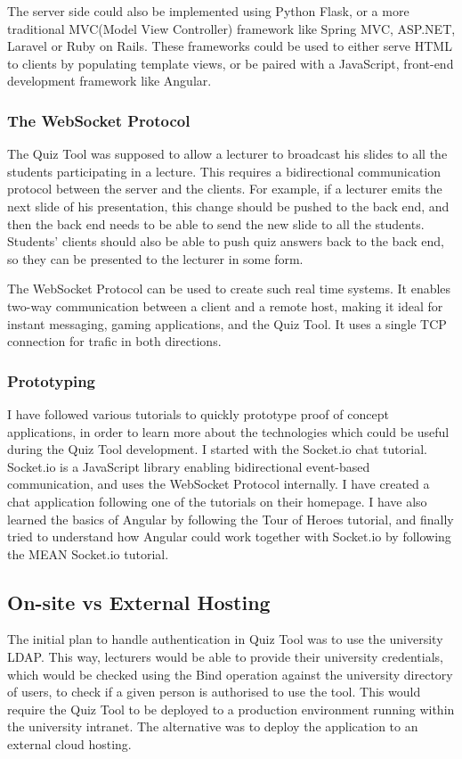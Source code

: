 The server side could also be implemented using Python Flask\cite{flask}, or a more
traditional MVC(Model View Controller)\cite{mvc} framework like Spring MVC\cite{spring},
ASP.NET\cite{asp}, Laravel\cite{laravel} or Ruby on Rails\cite{ror}. These frameworks could be used
to either serve HTML to clients by populating template views, or be paired
with a JavaScript, front-end development framework like Angular.

\subsubsection{The WebSocket Protocol}
The Quiz Tool was supposed to allow a lecturer to broadcast his slides to all the students
participating in a lecture. This requires a bidirectional communication protocol between the
server and the clients. For example, if a lecturer emits the next slide of his presentation,
this change should be pushed to the back end, and then the back end needs to be able to
send the new slide to all the students. Students' clients should also be able to push quiz
answers back to the back end, so they can be presented to the lecturer in some form.

The WebSocket Protocol can be used to create such real time systems. It enables two-way
communication between a client and a remote host, making it ideal for instant messaging,
gaming applications, and the Quiz Tool. It uses a single TCP connection for trafic
in both directions\cite{11}.

\subsubsection{Prototyping}
I have followed various tutorials to quickly prototype proof of concept applications,
in order to learn more about the technologies which could be useful during the Quiz Tool
development. I started with the Socket.io chat tutorial. Socket.io is
a JavaScript library enabling bidirectional event-based communication, and uses
the WebSocket Protocol internally\cite{12}. I have created a chat application following one
of the tutorials on their homepage\cite{13}. I have also learned the basics of
Angular by following the Tour of Heroes tutorial\cite{14}, and finally tried to
understand how Angular could work together with Socket.io by following the MEAN
Socket.io tutorial\cite{15}.

\subsection{On-site vs External Hosting}
The initial plan to handle authentication in Quiz Tool was to use the university
LDAP\cite{16}. This way, lecturers would be able to provide their university credentials,
which would be checked using the Bind operation against the university directory of users,
to check if a given person is authorised to use the tool. This would require the Quiz Tool
to be deployed to a production environment running within the university intranet. The
alternative was to deploy the application to an external cloud hosting.

